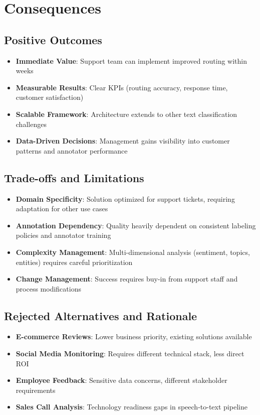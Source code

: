 \documentclass[11pt]{article}
\begin{document}
\section{Consequences}

\subsection{Positive Outcomes}
\begin{itemize}
\item \textbf{Immediate Value}: Support team can implement improved routing within weeks
\item \textbf{Measurable Results}: Clear KPIs (routing accuracy, response time, customer satisfaction)
\item \textbf{Scalable Framework}: Architecture extends to other text classification challenges
\item \textbf{Data-Driven Decisions}: Management gains visibility into customer patterns and annotator performance
\end{itemize}

\subsection{Trade-offs and Limitations}
\begin{itemize}
\item \textbf{Domain Specificity}: Solution optimized for support tickets, requiring adaptation for other use cases
\item \textbf{Annotation Dependency}: Quality heavily dependent on consistent labeling policies and annotator training
\item \textbf{Complexity Management}: Multi-dimensional analysis (sentiment, topics, entities) requires careful prioritization
\item \textbf{Change Management}: Success requires buy-in from support staff and process modifications
\end{itemize}

\subsection{Rejected Alternatives and Rationale}
\begin{itemize}
\item \textbf{E-commerce Reviews}: Lower business priority, existing solutions available
\item \textbf{Social Media Monitoring}: Requires different technical stack, less direct ROI
\item \textbf{Employee Feedback}: Sensitive data concerns, different stakeholder requirements
\item \textbf{Sales Call Analysis}: Technology readiness gaps in speech-to-text pipeline
\end{itemize}
\end{document}
